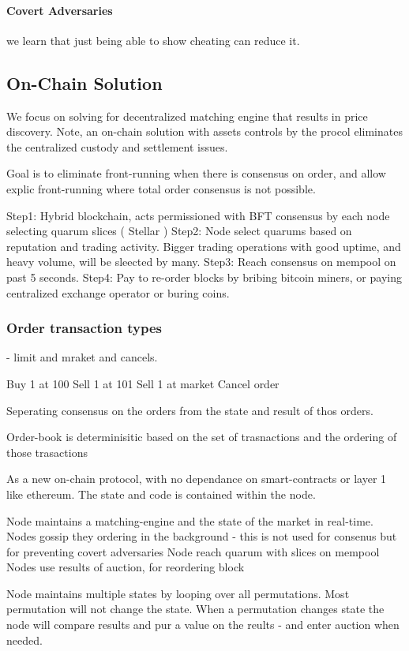 \documentclass[12pt]{article}
\begin{document}
\paragraph*{Covert Adversaries} we learn that just being able to show cheating can reduce it. 

\subsection{On-Chain Solution}
We focus on solving for decentralized matching engine that results in price discovery. Note, an on-chain solution with assets controls by the procol eliminates the centralized custody and settlement issues. 

Goal is to eliminate front-running when there is consensus on order, and allow explic front-running where total order consensus is not possible.

Step1: Hybrid blockchain, acts permissioned with BFT consensus by each node selecting quarum slices  ( Stellar )
Step2: Node select quarums based on reputation and trading activity. Bigger trading operations with good uptime, and heavy volume, will be sleected by many. 
Step3: Reach consensus on mempool on past 5 seconds. 
Step4: Pay to re-order blocks by bribing bitcoin miners, or paying centralized exchange operator or buring coins. 


\subsubsection{Order transaction types} - limit and mraket and cancels. 

Buy 1 at 100
Sell 1 at 101 
Sell 1 at market
Cancel order 

Seperating consensus on the orders from the state and result of thos orders. 

Order-book is determinisitic based on the set of trasnactions and the ordering of those trasactions 

As a new on-chain protocol, with no dependance on smart-contracts or layer 1 like ethereum. The state and code is contained within the node. 

Node maintains a matching-engine and the state of the market in real-time. 
Nodes gossip they ordering in the background - this is not used for consenus but for preventing covert adversaries 
Node reach quarum with slices on mempool
Nodes use results of auction, for reordering block  

Node maintains multiple states by looping over all permutations. Most permutation will not change the state. 
When a permutation changes state the node will compare results and pur a value on the reults - and enter auction when needed. 
\end{document}
